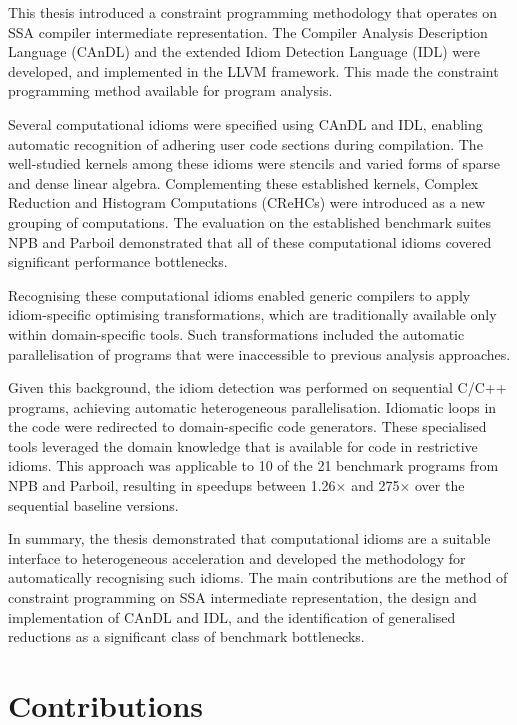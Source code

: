 
    This thesis introduced a constraint programming methodology that operates on
    SSA compiler intermediate representation.
    The Compiler Analysis Description Language (CAnDL) and the extended Idiom
    Detection Language (IDL) were developed, and implemented in the LLVM
    framework.
    This made the constraint programming method available for program analysis.

    Several computational idioms were specified using CAnDL and IDL, enabling
    automatic recognition of adhering user code sections during compilation.
    The well-studied kernels among these idioms were stencils and varied
    forms of sparse and dense linear algebra.
    Complementing these established kernels, Complex Reduction and Histogram
    Computations (CReHCs) were introduced as a new grouping of computations.
    The evaluation on the established benchmark suites NPB and Parboil demonstrated
    that all of these computational idioms covered significant performance
    bottlenecks.

    Recognising these computational idioms enabled generic compilers to apply
    idiom-specific optimising transformations, which are traditionally available
    only within domain-specific tools.
    Such transformations included the automatic parallelisation of programs that
    were inaccessible to previous analysis approaches.

    Given this background, the idiom detection was performed on sequential C/C++
    programs, achieving automatic heterogeneous parallelisation.
    Idiomatic loops in the code were redirected to domain-specific code
    generators.
    These specialised tools leveraged the domain knowledge that is available for
    code in restrictive idioms.
    This approach was applicable to 10 of the 21 benchmark programs from NPB and
    Parboil, resulting in speedups between 1.26$\times$ and 275$\times$ over the
    sequential baseline versions.

    In summary, the thesis demonstrated that computational idioms are a
    suitable interface to heterogeneous acceleration and developed the
    methodology for automatically recognising such idioms.
    The main contributions are the method of constraint programming on SSA
    intermediate representation, the design and implementation of CAnDL and IDL,
    and the identification of generalised reductions as a significant class of
    benchmark bottlenecks.

\section{Contributions}

